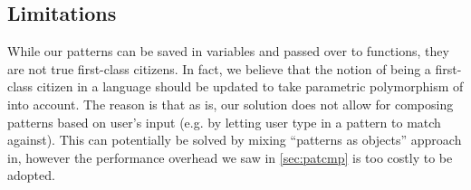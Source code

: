 


\subsection{Limitations}
\label{sec:ommlimit}

While our patterns can be saved in variables and passed over to functions, they 
are not true first-class citizens. In fact, we believe that the notion of being 
a first-class citizen in a language should be updated to take parametric 
polymorphism of \Cpp{} into account. The reason is that as is, our solution does
not allow for composing patterns based on user's input (e.g. by letting user 
type in a pattern to match against). This can potentially be solved by mixing 
``patterns as objects'' approach in, however the performance overhead we saw in 
\textsection\ref{sec:patcmp} is too costly to be adopted.
